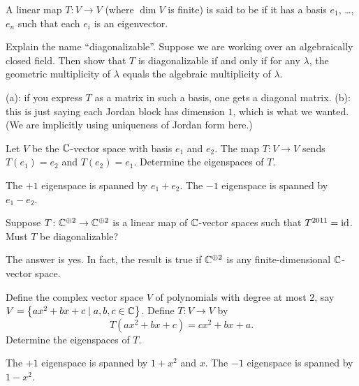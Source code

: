 \begin{problem}
	A linear map $T \colon V \to V$ (where $\dim V$ is finite)
	is said to be 
	if it has a basis $e_1$, \dots, $e_n$
	such that each $e_i$ is an eigenvector.
	\begin{enumerate}[(a)]
		\ii Explain the name ``diagonalizable''.
		\ii Suppose we are working over an algebraically closed field.
		Then show that $T$ is diagonalizable if and only if
		for any $\lambda$, the geometric multiplicity of $\lambda$
		equals the algebraic multiplicity of $\lambda$.
	\end{enumerate}
	\begin{sol}
		(a): if you express $T$ as a matrix in such a basis,
		one gets a diagonal matrix.
		(b): this is just saying each Jordan block has dimension $1$,
		which is what we wanted.
		(We are implicitly using uniqueness of Jordan form here.)
	\end{sol}
\end{problem}

\begin{problem}
	[Switcharoo]
	Let $V$ be the $\mathbb C$-vector space
	with basis $e_1$ and $e_2$.
	The map $T \colon V \to V$ sends $T(e_1) = e_2$ and $T(e_2) = e_1$.
	Determine the eigenspaces of $T$.
	\begin{sol}
		The $+1$ eigenspace is spanned by $e_1+e_2$.
		The $-1$ eigenspace is spanned by $e_1-e_2$.
	\end{sol}
\end{problem}

\begin{problem}
	Suppose $T \colon \mathbb C^{\oplus 2} \to \mathbb C^{\oplus 2}$
	is a linear map of $\mathbb C$-vector spaces such that $T^{2011} = \mathrm{id}$.
	Must $T$ be diagonalizable?
	\begin{hint}
		The answer is yes.
		In fact, the result is true if $\mathbb C^{\oplus 2}$ is any finite-dimensional
		$\mathbb C$-vector space.
	\end{hint}
\end{problem}

\begin{problem}
	Define the complex vector space $V$
	of polynomials with degree at most $2$,
	say $V = \left\{ ax^2 + bx + c \mid a,b,c \in \mathbb C \right\}$.
	Define $T \colon V \to V$ by
	\[ T(ax^2+bx+c) = cx^2+bx+a. \]
	Determine the eigenspaces of $T$.
	\begin{sol}
		The $+1$ eigenspace is spanned by $1+x^2$ and $x$.
		The $-1$ eigenspace is spanned by $1-x^2$.
	\end{sol}
\end{problem}

